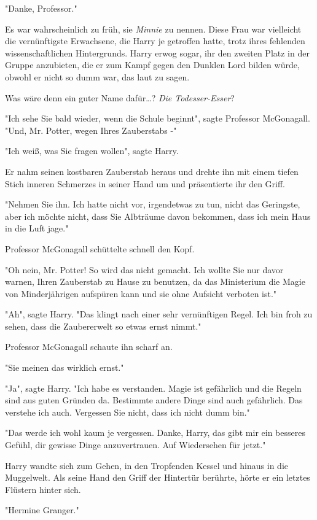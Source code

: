 {"Danke, Professor."

Es war wahrscheinlich zu früh, sie \emph{Minnie} zu nennen. Diese Frau war vielleicht die vernünftigste Erwachsene, die Harry je getroffen hatte, trotz ihres fehlenden wissenschaftlichen Hintergrunds. Harry erwog sogar, ihr den zweiten Platz in der Gruppe anzubieten, die er zum Kampf gegen den Dunklen Lord bilden würde, obwohl er nicht so dumm war, das laut zu sagen.

Was wäre denn ein guter Name dafür…? \emph{Die Todesser-Esser}?

"Ich sehe Sie bald wieder, wenn die Schule beginnt", sagte Professor McGonagall. "Und, Mr. Potter, wegen Ihres Zauberstabs -"

"Ich weiß, was Sie fragen wollen", sagte Harry.

Er nahm seinen kostbaren Zauberstab heraus und drehte ihn mit einem tiefen Stich inneren Schmerzes in seiner Hand um und präsentierte ihr den Griff.

"Nehmen Sie ihn. Ich hatte nicht vor, irgendetwas zu tun, nicht das Geringste, aber ich möchte nicht, dass Sie Albträume davon bekommen, dass ich mein Haus in die Luft jage."

Professor McGonagall schüttelte schnell den Kopf.

"Oh nein, Mr. Potter! So wird das nicht gemacht. Ich wollte Sie nur davor warnen, Ihren Zauberstab zu Hause zu benutzen, da das Ministerium die Magie von Minderjährigen aufspüren kann und sie ohne Aufsicht verboten ist."

"Ah", sagte Harry. "Das klingt nach einer sehr vernünftigen Regel. Ich bin froh zu sehen, dass die Zaubererwelt so etwas ernst nimmt."

Professor McGonagall schaute ihn scharf an.

"Sie meinen das wirklich ernst."

"Ja", sagte Harry. "Ich habe es verstanden. Magie ist gefährlich und die Regeln sind aus guten Gründen da. Bestimmte andere Dinge sind auch gefährlich. Das verstehe ich auch. Vergessen Sie nicht, dass ich nicht dumm bin."

"Das werde ich wohl kaum je vergessen. Danke, Harry, das gibt mir ein besseres Gefühl, dir gewisse Dinge anzuvertrauen. Auf Wiedersehen für jetzt."

Harry wandte sich zum Gehen, in den Tropfenden Kessel und hinaus in die Muggelwelt. Als seine Hand den Griff der Hintertür berührte, hörte er ein letztes Flüstern hinter sich.

"Hermine Granger."

}

